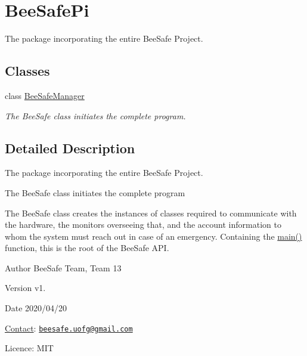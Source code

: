 \hypertarget{group___bee_safe_pi}{}\section{Bee\+Safe\+Pi}
\label{group___bee_safe_pi}


The package incorporating the entire Bee\+Safe Project.  


\subsection*{Classes}
\begin{DoxyCompactItemize}
\item 
class \hyperlink{class_bee_safe_manager}{Bee\+Safe\+Manager}
\begin{DoxyCompactList}\small\item\em The Bee\+Safe class initiates the complete program. \end{DoxyCompactList}\end{DoxyCompactItemize}


\subsection{Detailed Description}
The package incorporating the entire Bee\+Safe Project. 

The Bee\+Safe class initiates the complete program

The Bee\+Safe class creates the instances of classes required to communicate with the hardware, the monitors overseeing that, and the account information to whom the system must reach out in case of an emergency. Containing the \hyperlink{_bee_safe_8cpp_ae66f6b31b5ad750f1fe042a706a4e3d4}{main()} function, this is the root of the Bee\+Safe A\+PI.

\begin{DoxyAuthor}{Author}
Bee\+Safe Team, Team 13
\end{DoxyAuthor}
\begin{DoxyVersion}{Version}
v1.
\end{DoxyVersion}
\begin{DoxyDate}{Date}
2020/04/20
\end{DoxyDate}
\hyperlink{class_contact}{Contact}\+: \href{mailto:beesafe.uofg@gmail.com}{\tt beesafe.\+uofg@gmail.\+com}

Licence\+: M\+IT 